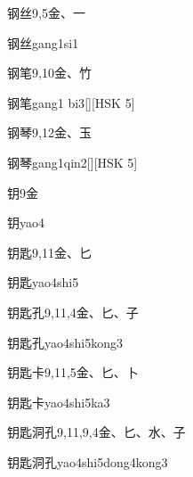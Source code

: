 \begin{Entry}{钢丝}{9,5}{⾦、⼀}
  \begin{Phonetics}{钢丝}{gang1si1}
  \end{Phonetics}
\end{Entry}

\begin{Entry}{钢笔}{9,10}{⾦、⽵}
  \begin{Phonetics}{钢笔}{gang1 bi3}[][HSK 5]
  \end{Phonetics}
\end{Entry}

\begin{Entry}{钢琴}{9,12}{⾦、⽟}
  \begin{Phonetics}{钢琴}{gang1qin2}[][HSK 5]
  \end{Phonetics}
\end{Entry}

\begin{Entry}{钥}{9}{⾦}
  \begin{Phonetics}{钥}{yao4}
  \end{Phonetics}
\end{Entry}

\begin{Entry}{钥匙}{9,11}{⾦、⼔}
  \begin{Phonetics}{钥匙}{yao4shi5}
  \end{Phonetics}
\end{Entry}

\begin{Entry}{钥匙孔}{9,11,4}{⾦、⼔、⼦}
  \begin{Phonetics}{钥匙孔}{yao4shi5kong3}
  \end{Phonetics}
\end{Entry}

\begin{Entry}{钥匙卡}{9,11,5}{⾦、⼔、⼘}
  \begin{Phonetics}{钥匙卡}{yao4shi5ka3}
  \end{Phonetics}
\end{Entry}

\begin{Entry}{钥匙洞孔}{9,11,9,4}{⾦、⼔、⽔、⼦}
  \begin{Phonetics}{钥匙洞孔}{yao4shi5dong4kong3}
  \end{Phonetics}
\end{Entry}

